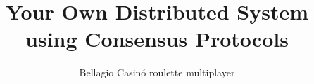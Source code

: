 \documentclass{sig-alternate-05-2015}
\begin{document}



\begin{comment}



%
\end{comment}
\title{Your Own Distributed System using Consensus Protocols}
\subtitle{Bellagio Casin\'o roulette multiplayer}
%
%
%
%
%
\end{document}

